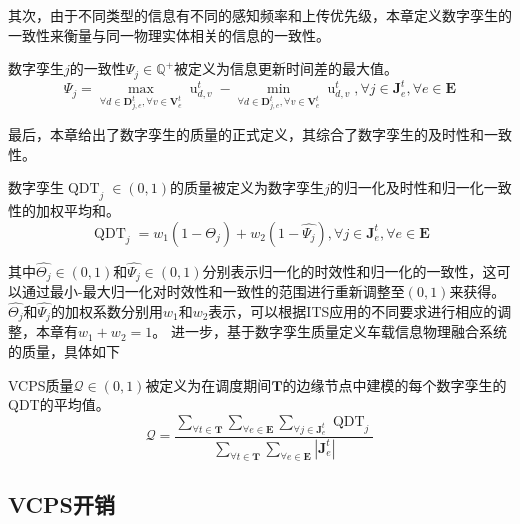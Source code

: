 其次，由于不同类型的信息有不同的感知频率和上传优先级，本章定义数字孪生的一致性来衡量与同一物理实体相关的信息的一致性。
\begin{definition}
数字孪生$j$的一致性$\Psi_{j} \in \mathbb{Q}^{+}$被定义为信息更新时间差的最大值。
\begin{equation}
    \Psi_{j}=\max_{\forall d \in \mathbf{D}_{j, e}^{t}, \forall v \in \mathbf{V}_{e}^{t}} {\operatorname{u}_{d, v}^t} - \min_{\forall d \in \mathbf{D}_{j, e}^{t}, \forall v \in \mathbf{V}_{e}^{t}} {\operatorname{u}_{d, v}^t} , \forall j \in \mathbf{J}_{e}^{t}, \forall e \in \mathbf{E}
\end{equation}
\end{definition}

最后，本章给出了数字孪生的质量的正式定义，其综合了数字孪生的及时性和一致性。
\begin{definition}
数字孪生$\operatorname{QDT}_{j} \in (0, 1)$的质量被定义为数字孪生$j$的归一化及时性和归一化一致性的加权平均和。
	\begin{equation}
	    \operatorname{QDT}_{j} = w_1 (1 -\hat{\Theta_{j}}) + w_2 (1 - \hat{\Psi_{j}}), \forall j \in \mathbf{J}_{e}^t, \forall e \in \mathbf{E}
	\end{equation}
\end{definition}
\noindent 其中$\hat{\Theta_{j}} \in (0, 1)$和$\hat{\Psi_{j}} \in (0, 1)$分别表示归一化的时效性和归一化的一致性，这可以通过最小-最大归一化对时效性和一致性的范围进行重新调整至$(0, 1)$来获得。
$\hat{\Theta_{j}}$和$\hat{\Psi_{j}}$的加权系数分别用$w_1$和$w_2$表示，可以根据ITS应用的不同要求进行相应的调整，本章有$w_1+w_2=1$。
进一步，基于数字孪生质量定义车载信息物理融合系统的质量，具体如下
\begin{definition}
VCPS质量$\mathscr{Q} \in (0, 1)$被定义为在调度期间$\mathbf{T}$的边缘节点中建模的每个数字孪生的QDT的平均值。
	\begin{equation}
		\mathscr{Q}=\frac{\sum_{\forall t \in \mathbf{T}} \sum_{\forall e \in \mathbf{E}} \sum_{\forall j \in \mathbf{J}_e^t} \operatorname{QDT}_{j}}{\sum_{\forall t \in \mathbf{T}} \sum_{\forall e \in \mathbf{E}} |\mathbf{J}_e^t| }
	\end{equation}
\end{definition}

\subsection{VCPS开销}

